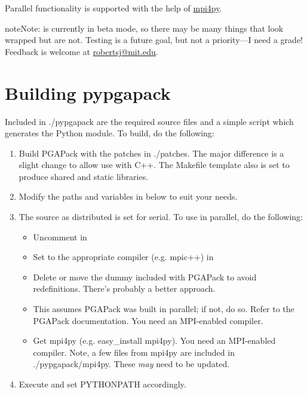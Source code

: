 \documentclass[letterpaper,11pt,english]{sphinxmanual}
\begin{document}
Parallel functionality is supported with the help of
\href{http://mpi4py.scipy.org/}{mpi4py}.

\begin{notice}{note}{Note:}
 is currently in beta mode, so there may be many
things that look wrapped but are not.  Testing is a future goal,
but not a priority---I need a grade!  Feedback is welcome at
\href{mailto:robertsj@mit.edu}{robertsj@mit.edu}.
\end{notice}


\section{Building pypgapack}
\label{getting_started:building-pypgapack}
Included in ./pypgapack are the required source files and a simple script
 which generates the Python module.  To build, do
the following:
\begin{enumerate}
\item {} 
Build PGAPack with the patches in ./patches.  The major difference is
a slight change to allow use with C++.  The Makefile template also is
set to produce shared and static libraries.

\item {} 
Modify the paths and variables in  below to suit
your needs.

\item {} 
The source as distributed is set for serial.  To use in parallel, do
the following:
\begin{itemize}
\item {} 
Uncomment  in 

\item {} 
Set  to the appropriate compiler (e.g. mpic++)
in 

\item {} 
Delete or move the dummy  included with PGAPack to avoid
redefinitions.  There's probably a better approach.

\item {} 
This assumes PGAPack was built in parallel; if not, do so.  Refer to
the PGAPack documentation.  You need an MPI-enabled compiler.

\item {} 
Get mpi4py (e.g. easy\_install mpi4py). You need an MPI-enabled compiler.
Note, a few files from mpi4py are included in ./pypgapack/mpi4py.  These
\emph{may} need to be updated.

\end{itemize}

\item {} 
Execute  and set PYTHONPATH accordingly.

\end{enumerate}
\end{document}
